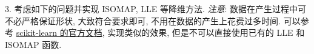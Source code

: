 \documentclass[openany]{ctexbook}
\theoremstyle{kaiti}
\theoremstyle{normal}
\begin{document}






3. 考虑如下的问题并实现 ISOMAP, LLE 等降维方法. \emph{注意}: 数据在产生过程中可不必严格保证形状, 大致符合要求即可, 不用在数据的产生上花费过多时间. 可以参考 \href{https://scikit-learn.org/stable/auto_examples/manifold/plot_compare_methods.html\#sphx-glr-auto-examples-manifold-plot-compare-methods-py}{scikit-learn 的官方文档}, 实现类似的效果, 但是不可以直接使用已有的 LLE 和 ISOMAP 函数.
\end{document}

